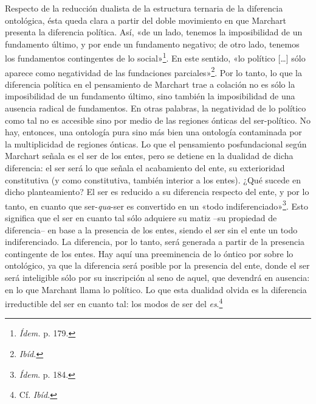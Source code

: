 Respecto de la reducción dualista de la estructura ternaria de la diferencia ontológica, ésta queda clara a partir del doble movimiento en que Marchart presenta la diferencia política. Así, «de un lado, tenemos la imposibilidad de un fundamento último, y por ende un fundamento negativo; de otro lado, tenemos los fundamentos contingentes de lo social»\footnote{\emph{Ídem.} p. 179.}. En este sentido, «lo político {[}\ldots{]} sólo aparece como negatividad de las fundaciones parciales»\footnote{\emph{Ibíd.}}. Por lo tanto, lo que la diferencia política en el pensamiento de Marchart trae a colación no es sólo la imposibilidad de un fundamento último, sino también la imposibilidad de una ausencia radical de fundamentos. En otras palabras, la negatividad de lo político como tal no es accesible sino por medio de las regiones ónticas del ser-político. No hay, entonces, una ontología pura sino más bien una ontología contaminada por la multiplicidad de regiones ónticas. Lo que el pensamiento posfundacional según Marchart señala es el ser de los entes, pero se detiene en la dualidad de dicha diferencia: el ser será lo que señala el acabamiento del ente, su exterioridad constitutiva (y como constitutiva, también interior a los entes). ¿Qué sucede en dicho planteamiento? El ser es reducido a su diferencia respecto del ente, y por lo tanto, en cuanto que ser-\emph{qua}-ser es convertido en un «todo indiferenciado»\footnote{\emph{Ídem}. p. 184.}. Esto significa que el ser en cuanto tal sólo adquiere su matiz --su propiedad de diferencia-- en base a la presencia de los entes, siendo el ser sin el ente un todo indiferenciado. La diferencia, por lo tanto, será generada a partir de la presencia contingente de los entes. Hay aquí una preeminencia de lo óntico por sobre lo ontológico, ya que la diferencia será posible por la presencia del ente, donde el ser será inteligible sólo por su inscripción al seno de aquel, que devendrá en ausencia: en lo que Marchant llama lo político. Lo que esta dualidad olvida es la diferencia irreductible del ser en cuanto tal: los modos de ser del \emph{es}.\footnote{Cf. \emph{Ibíd.}}


